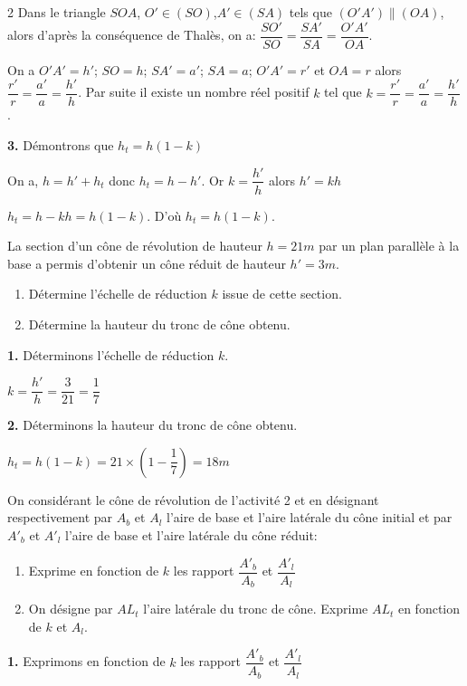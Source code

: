 \begin{multicols*}{2}
  	Dans le triangle $SOA$, $O'\in (SO)$,$A'\in (SA)$ tels que $(O'A') \parallel (OA)$, alors d'après la conséquence de Thalès, on a: $\dfrac{SO'}{SO}=\dfrac{SA'}{SA}=\dfrac{O'A'}{OA}$.
  	
  	On a $O'A'=h'$; $SO=h$; $SA'=a'$; $SA=a$; $O'A'=r'$ et $OA=r$  alors $\dfrac{r'}{r}=\dfrac{a'}{a}=\dfrac{h'}{h}$. Par suite il existe un nombre réel positif $k$ tel que  $k=\dfrac{r'}{r}=\dfrac{a'}{a}=\dfrac{h'}{h}$.
  	
  	\textbf{3.} Démontrons que $h_{t}=h\left(1-k\right)$
  	
  	On a, $h=h'+h_{t}$  donc $h_{t}=h-h'$. Or $k=\dfrac{h'}{h}$ alors $h'=kh$
  	
  	$h_{t}=h-kh=h\left(1-k\right)$. D'où $h_{t}=h\left(1-k\right)$.
  	
  	\hspace*{0.5cm} La section d'un cône de révolution de hauteur $h=21m$ par un plan parallèle à la base a permis d'obtenir un cône réduit de hauteur $h'=3m$.
  	\begin{enumerate}
  		\item Détermine l'échelle de réduction $k$ issue de cette section.
  		\item Détermine la hauteur du tronc de cône obtenu.
  	\end{enumerate}
  	\dure
  	\resul
  	\textbf{1.} Déterminons l'échelle de réduction $k$.
  	
  	$k=\dfrac{h'}{h}=\dfrac{3}{21}=\dfrac{1}{7}$
  	
  	\textbf{2.}  Déterminons la hauteur du tronc de cône obtenu.
  	
  	$h_{t}=h\left(1-k\right)= 21\times\left(1-\dfrac{1}{7}\right)=18m$
  	
  	
  	On considérant le cône de révolution de l'activité 2 et en désignant  respectivement par $A_{b}$ et $A_{l}$ l'aire de base et l'aire latérale du cône initial et par  $A'_{b}$ et $A'_{l}$ l'aire de base et l'aire latérale du cône réduit:
  	\begin{enumerate}
  		\item Exprime en fonction de $k$ les rapport $\dfrac{A'_{b}}{A_{b}}$ et $\dfrac{A'_{l}}{A_{l}}$  
  		\item On désigne par $AL_{t}$ l'aire latérale du tronc de cône. Exprime $AL_{t}$  en fonction de $k$ et $A_{l}$. 
  	\end{enumerate}
  	\dure
  	\textbf{1.} Exprimons en fonction de $k$ les rapport $\dfrac{A'_{b}}{A_{b}}$ et $\dfrac{A'_{l}}{A_{l}}$ 
  	

\end{multicols*}
